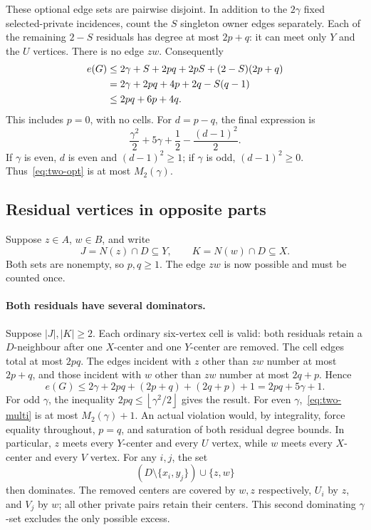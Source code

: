 \documentclass[11pt]{article}
\theoremstyle{definition}
\theoremstyle{remark}
\newcommand{\e}{e}
\newcommand{\floor}[1]{\left\lfloor#1\right\rfloor}
\begin{document}
These optional edge sets are pairwise disjoint. In addition to the
$2\gamma$ fixed selected-private incidences, count the $S$ singleton owner
edges separately. Each of the remaining $2-S$ residuals has degree at most
$2p+q$: it can meet only $Y$ and the $U$ vertices. There is no edge $zw$.
Consequently
\begin{align}
 \e(G)&\le 2\gamma+S+2pq+2pS+(2-S)(2p+q)\notag\\
       &=2\gamma+2pq+4p+2q-S(q-1)\notag\\
       &\le 2pq+6p+4q.\label{eq:two-same}
\end{align}
This includes $p=0$, with no cells. For $d=p-q$, the final expression is
\begin{equation}\label{eq:two-opt}
 \frac{\gamma^2}{2}+5\gamma+\frac12-\frac{(d-1)^2}{2}.
\end{equation}
If $\gamma$ is even, $d$ is even and $(d-1)^2\ge1$; if $\gamma$ is odd,
$(d-1)^2\ge0$. Thus~\eqref{eq:two-opt} is at most $M_2(\gamma)$.

\subsection{Residual vertices in opposite parts}

Suppose $z\in A$, $w\in B$, and write
\[
 J=N(z)\cap D\subseteq Y,\qquad K=N(w)\cap D\subseteq X.
\]
Both sets are nonempty, so $p,q\ge1$. The edge $zw$ is now possible and
must be counted once.

\paragraph{Both residuals have several dominators.}
Suppose $|J|,|K|\ge2$. Each ordinary six-vertex cell is valid: both
residuals retain a $D$-neighbour after one $X$-center and one $Y$-center
are removed. The cell edges total at most $2pq$. The edges incident with
$z$ other than $zw$ number at most $2p+q$, and those incident with $w$
other than $zw$ number at most $2q+p$. Hence
\begin{equation}\label{eq:two-multi}
 \e(G)\le2\gamma+2pq+(2p+q)+(2q+p)+1=2pq+5\gamma+1.
\end{equation}
For odd $\gamma$, the inequality $2pq\le\floor{\gamma^2/2}$ gives the result.
For even $\gamma$,~\eqref{eq:two-multi} is at most $M_2(\gamma)+1$.
An actual violation would, by integrality, force equality throughout,
$p=q$, and saturation of both residual degree bounds. In particular,
$z$ meets every $Y$-center and every $U$ vertex, while $w$ meets every
$X$-center and every $V$ vertex. For any $i,j$, the set
\[
 (D\setminus\{x_i,y_j\})\cup\{z,w\}
\]
then dominates. The removed centers are covered by $w,z$ respectively,
$U_i$ by $z$, and $V_j$ by $w$; all other private pairs retain their centers.
This second dominating $\gamma$-set excludes the only possible excess.
\end{document}
